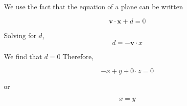 \documentclass{article}
\begin{document}
We use the fact that the equation of a plane can be written

$$\bm{v} \cdot \bm{x} + d = 0$$

Solving for $d$,
$$
d = - \bm{v} \cdot {x}
$$



We find that $d=0$
Therefore,

$$
-x + y + 0 \cdot z = 0
$$

or

$$
x = y
$$
\end{document}
